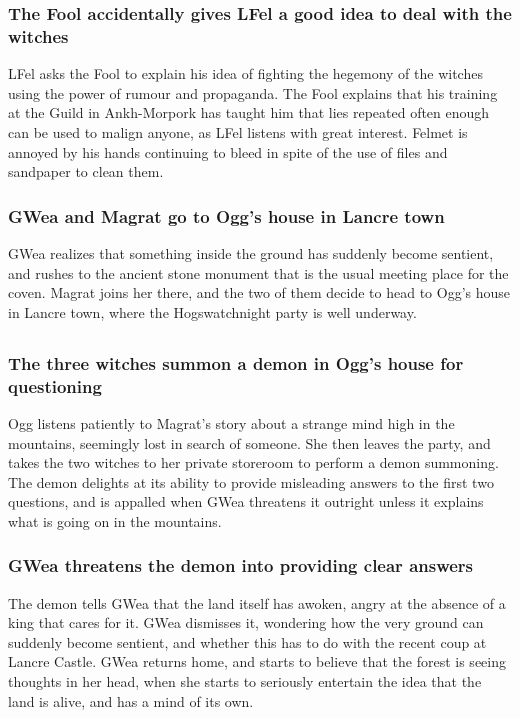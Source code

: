 \subsubsection{The \Gls{Fool} accidentally gives \Gls{LFel} a good idea to deal with the witches}
\Gls{LFel} asks the \Gls{Fool} to explain his idea of fighting the hegemony of the witches using
the power of rumour and propaganda. The \Gls{Fool} explains that his training at the Guild in
Ankh-Morpork has taught him that lies repeated often enough can be used to malign anyone, as
\Gls{LFel} listens with great interest. \Gls{Felmet} is annoyed by his hands continuing to bleed
in spite of the use of files and sandpaper to clean them.

\subsubsection{\Gls{GWea} and \Gls{Magrat} go to \Gls{Ogg}'s house in Lancre town}
\Gls{GWea} realizes that something inside the ground has suddenly become sentient, and rushes to the
ancient stone monument that is the usual meeting place for the coven. \Gls{Magrat} joins her there,
and the two of them decide to head to \Gls{Ogg}'s house in Lancre town, where the Hogswatchnight
party is well underway.

\subsection{}
\subsubsection{The three witches summon a demon in \Gls{Ogg}'s house for questioning}
\Gls{Ogg} listens patiently to \Gls{Magrat}'s story about a strange mind high in the mountains,
seemingly lost in search of someone. She then leaves the party, and takes the two witches to her
private storeroom to perform a demon summoning. The demon delights at its ability to provide
misleading answers to the first two questions, and is appalled when \Gls{GWea} threatens it outright
unless it explains what is going on in the mountains.

\subsubsection{\Gls{GWea} threatens the demon into providing clear answers}
The demon tells \Gls{GWea} that the land itself has awoken, angry at the absence of a king that
cares for it. \Gls{GWea} dismisses it, wondering how the very ground can suddenly become sentient,
and whether this has to do with the recent coup at Lancre Castle. \Gls{GWea} returns home, and
starts to believe that the forest is seeing thoughts in her head, when she starts to seriously
entertain the idea that the land is alive, and has a mind of its own.


